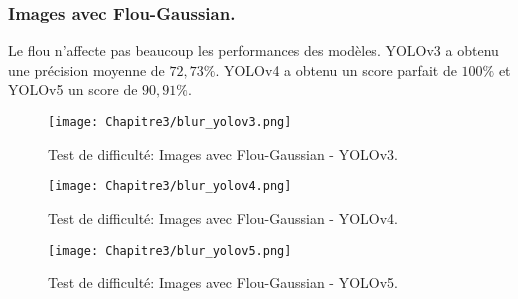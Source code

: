           \subsubsection{Images avec Flou-Gaussian.}
          Le flou n'affecte pas beaucoup les performances des modèles. YOLOv3 a obtenu une précision moyenne de $72,73\%$. YOLOv4 a obtenu un score parfait de $100\%$ et YOLOv5 un score de $90,91\%$.
          \begin{figure}[H]
                    \centering
                    \texttt{[image: Chapitre3/blur\_yolov3.png]}
                    \caption{Test de difficulté: Images avec Flou-Gaussian - YOLOv3.}
                    \label{y3_blur}
                    \end{figure}
          \begin{figure}[H]
                    \centering
                    \texttt{[image: Chapitre3/blur\_yolov4.png]}
                    \caption{Test de difficulté: Images avec Flou-Gaussian - YOLOv4.}
                    \label{y4_blur}
                    \end{figure}
          \begin{figure}[H]
                    \centering
                    \texttt{[image: Chapitre3/blur\_yolov5.png]}
                    \caption{Test de difficulté: Images avec Flou-Gaussian - YOLOv5.}
                    \label{y5_blur}
                    \end{figure}

